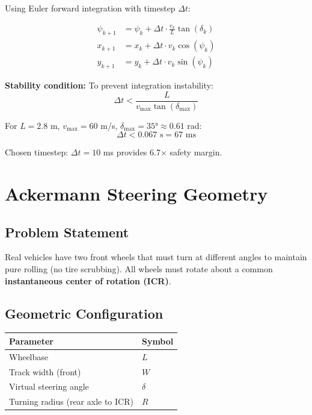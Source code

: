 \documentclass[11pt,a4paper]{article}
\begin{document}
Using Euler forward integration with timestep $\Delta t$:

\begin{align}
\psi_{k+1} &= \psi_k + \Delta t \cdot \frac{v_k}{L} \tan(\delta_k) \\
x_{k+1} &= x_k + \Delta t \cdot v_k \cos(\psi_k) \\
y_{k+1} &= y_k + \Delta t \cdot v_k \sin(\psi_k)
\end{align}

\textbf{Stability condition:} To prevent integration instability:
\begin{equation}
\Delta t < \frac{L}{v_{\max} \tan(\delta_{\max})}
\end{equation}

For $L=2.8$ m, $v_{\max}=60$ m/s, $\delta_{\max}=35° \approx 0.61$ rad:
\begin{equation}
\Delta t < 0.067 \text{ s} = 67 \text{ ms}
\end{equation}

Chosen timestep: $\Delta t = 10$ ms provides 6.7$\times$ safety margin.

\section{Ackermann Steering Geometry}

\subsection{Problem Statement}

Real vehicles have two front wheels that must turn at different angles to maintain pure rolling (no tire scrubbing). All wheels must rotate about a common \textbf{instantaneous center of rotation (ICR)}.

\subsection{Geometric Configuration}

\begin{center}
\begin{tabular}{ll}
\toprule
Parameter & Symbol \\
\midrule
Wheelbase & $L$ \\
Track width (front) & $W$ \\
Virtual steering angle & $\delta$ \\
Turning radius (rear axle to ICR) & $R$ \\
\bottomrule
\end{tabular}
\end{center}
\end{document}
